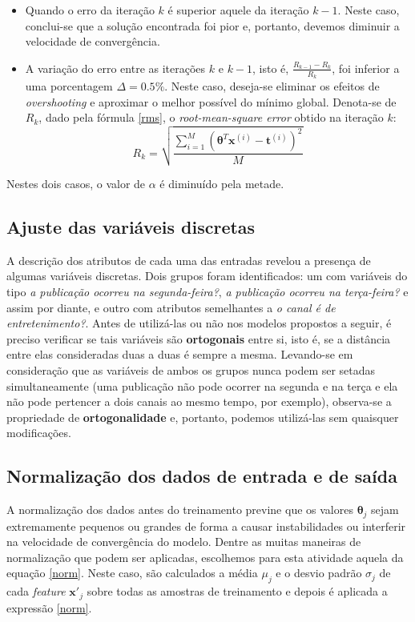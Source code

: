 \documentclass[10pt,twocolumn,letterpaper]{article}
\begin{document}
\begin{itemize}
	\item Quando o erro da iteração \(k\) é superior aquele da iteração \(k -1\). Neste caso, conclui-se que a solução encontrada foi pior e, portanto, devemos diminuir a velocidade de convergência.
	\item A variação do erro entre as iterações \(k\) e \(k -1\), isto é, \(\frac{R_{k - 1} - R_k}{R_k}\), foi inferior a uma porcentagem \(\Delta = 0.5\%\). Neste caso, deseja-se eliminar os efeitos de \textit{overshooting} e aproximar o melhor possível do mínimo global. Denota-se de \(R_k\), dado pela fórmula \ref {rms}, o \textit{root-mean-square error} obtido na iteração \(k\):
	\begin {equation}
	\label{rms}
	R_k = \sqrt{\frac {\sum_{i=1}^{M} \left(\bm{\theta}^T\bm{x}^{(i)} - \bm{t}^{(i)}\right)^2}{M}}
	\end{equation}
\end{itemize}

Nestes dois casos, o valor de \(\alpha\) é diminuído pela metade.

\subsection {Ajuste das variáveis discretas}

A descrição dos atributos de cada uma das entradas revelou a presença de algumas variáveis discretas. Dois grupos foram identificados: um com variáveis do tipo \textit{a publicação ocorreu na segunda-feira?}, \textit{a publicação ocorreu na terça-feira?} e assim por diante, e outro com atributos semelhantes a \textit{o canal é de entretenimento?}. Antes de utilizá-las ou não nos modelos propostos a seguir, é preciso verificar se tais variáveis são \textbf {ortogonais} entre si, isto é, se a distância entre elas consideradas duas a duas é sempre a mesma. Levando-se em consideração que as variáveis de ambos os grupos nunca podem ser setadas simultaneamente (uma publicação não pode ocorrer na segunda e na terça e ela não pode pertencer a dois canais ao mesmo tempo, por exemplo), observa-se a propriedade de \textbf {ortogonalidade} e, portanto, podemos utilizá-las sem quaisquer modificações.

\subsection {Normalização dos dados de entrada e de saída}

A normalização dos dados antes do treinamento previne que os valores \(\bm{\theta}_j\) sejam extremamente pequenos ou grandes de forma a
causar instabilidades ou interferir na velocidade de convergência do modelo. Dentre as muitas maneiras de normalização que podem ser aplicadas, escolhemos para esta atividade aquela da equação \ref{norm}. Neste caso, são calculados a média \(\mu_j\) e o desvio padrão \(\sigma_j\) de cada \textit{feature} \(\bm {x'}_j\) sobre todas as amostras de treinamento e depois é aplicada a expressão \ref{norm}.
\end{document}
